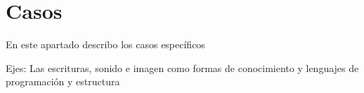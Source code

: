 \chapter{Casos}

En este apartado describo los casos específicos

Ejes: Las escrituras, sonido e imagen como formas de conocimiento y lenguajes de programación y estructura
